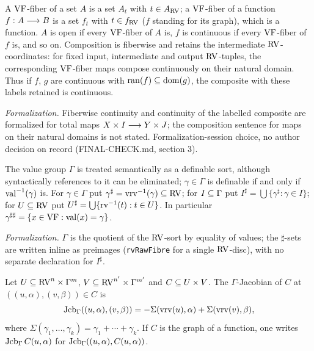 \setcounter{theorem}{5}
\begin{definition}
\label{rvfiber}
\leanok
{}
A $\mathrm{VF}$-fiber of a set $A$ is a set $A_t$ with $t \in A_{\mathrm{RV}}$; a $\mathrm{VF}$-fiber of a function $f : A \longrightarrow B$ is a set $f_t$ with $t \in f_{\mathrm{RV}}$ ($f$ standing for its graph), which is a function. $A$ is open if every $\mathrm{VF}$-fiber of $A$ is, $f$ is continuous if every $\mathrm{VF}$-fiber of $f$ is, and so on. Composition is fiberwise and retains the intermediate $\mathrm{RV}$-coordinates: for fixed input, intermediate and output $\mathrm{RV}$-tuples, the corresponding $\mathrm{VF}$-fiber maps compose continuously on their natural domain. Thus if $f$, $g$ are continuous with $\operatorname{ran}(f) \subseteq \operatorname{dom}(g)$, the composite with these labels retained is continuous.

\emph{Formalization.} Fiberwise continuity and continuity of the labelled composite are formalized for total maps $X \times I \longrightarrow Y \times J$; the composition sentence for maps on their natural domains is not stated. Formalization-session choice, no author decision on record (FINAL-CHECK.md, section 3).
\end{definition}

\setcounter{theorem}{6}
\begin{definition}
\label{gamwhat}
\leanok
The value group $\Gamma$ is treated semantically as a definable sort, although syntactically references to it can be eliminated; $\gamma \in \Gamma$ is definable if and only if $\operatorname{val}^{-1}(\gamma)$ is. For $\gamma \in \Gamma$ put $\gamma^\sharp = \operatorname{vrv}^{-1}(\gamma) \subseteq \mathrm{RV}$; for $I \subseteq \Gamma$ put $I^\sharp = \bigcup\{\gamma^\sharp : \gamma \in I\}$; for $U \subseteq \mathrm{RV}$ put $U^\sharp = \bigcup\{\operatorname{rv}^{-1}(t) : t \in U\}$. In particular $\gamma^{\sharp\sharp} = \{x \in \mathrm{VF} : \operatorname{val}(x) = \gamma\}$.

\emph{Formalization.} $\Gamma$ is the quotient of the $\mathrm{RV}$-sort by equality of values; the $\sharp$-sets are written inline as preimages (\texttt{rvRawFibre} for a single $\mathrm{RV}$-disc), with no separate declaration for $I^\sharp$.
\end{definition}

\setcounter{theorem}{7}
\begin{definition}
\label{jcbG-op}
\leanok
{}
Let $U \subseteq \mathrm{RV}^n \times \Gamma^m$, $V \subseteq \mathrm{RV}^{n'} \times \Gamma^{m'}$ and $C \subseteq U \times V$. The $\Gamma$-Jacobian of $C$ at $((u,\alpha),(v,\beta)) \in C$ is
\[ \operatorname{Jcb}_{\Gamma}((u,\alpha),(v,\beta)) = -\Sigma(\operatorname{vrv}(u),\alpha) + \Sigma(\operatorname{vrv}(v),\beta), \]
where $\Sigma(\gamma_1, \ldots, \gamma_k) = \gamma_1 + \cdots + \gamma_k$. If $C$ is the graph of a function, one writes $\operatorname{Jcb}_{\Gamma} C(u,\alpha)$ for $\operatorname{Jcb}_{\Gamma}((u,\alpha), C(u,\alpha))$.
\end{definition}

